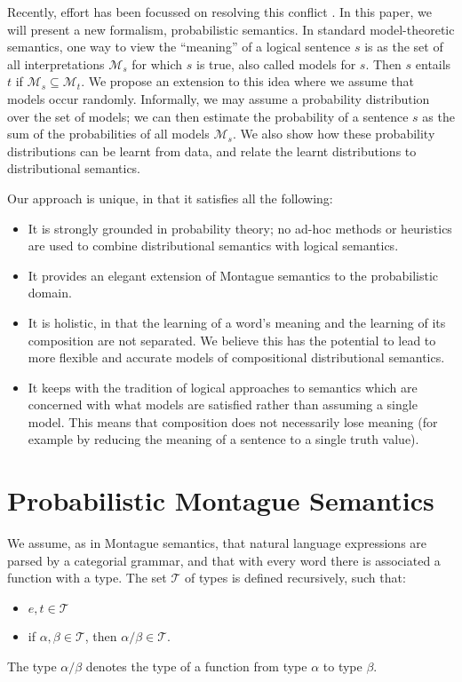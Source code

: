 \documentclass[letterpaper]{article}
\begin{document}
Recently, effort has been focussed on resolving this conflict
\cite{Clarke:07,Coecke:10,Garrette:11,Lewis:13}. In this paper, we
will present a new formalism, probabilistic semantics. In standard
model-theoretic semantics, one way to view the ``meaning'' of a
logical sentence $s$ is as the set of all interpretations
$\mathcal{M}_s$ for which $s$ is true, also called models for
$s$. Then $s$ entails $t$ if $\mathcal{M}_s \subseteq
\mathcal{M}_t$. We propose an extension to this idea where we assume
that models occur randomly. Informally, we may assume a probability
distribution over the set of models; we can then estimate the
probability of a sentence $s$ as the sum of the probabilities of all
models $\mathcal{M}_s$. We also show how these probability
distributions can be learnt from data, and relate the learnt
distributions to distributional semantics.

Our approach is unique, in that it satisfies all the following:
\begin{itemize}
\item It is strongly grounded in probability theory; no ad-hoc methods
  or heuristics are used to combine distributional semantics with
  logical semantics.
\item It provides an elegant extension of Montague semantics to the
  probabilistic domain.
\item It is holistic, in that the learning of a word's meaning and the
  learning of its composition are not separated. We believe this has
  the potential to lead to more flexible and accurate models of
  compositional distributional semantics.
\item It keeps with the tradition of logical approaches to semantics
  which are concerned with what models are satisfied rather than
  assuming a single model. This means that composition does not
  necessarily lose meaning (for example by reducing the meaning of a
  sentence to a single truth value).
\end{itemize}


\section{Probabilistic Montague Semantics}

We assume, as in Montague semantics, that natural language expressions
are parsed by a categorial grammar, and that with every word there is
associated a function with a type. The set $\mathcal{T}$ of types is defined
recursively, such that:
\begin{itemize}
\item $e,t\in \mathcal{T}$
\item if $\alpha, \beta\in \mathcal{T}$, then $\alpha/\beta\in \mathcal{T}$.
\end{itemize}
The type $\alpha/\beta$ denotes the type of a function from type
$\alpha$ to type $\beta$.
\end{document}
